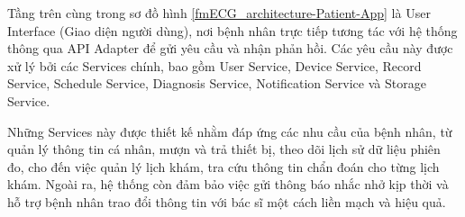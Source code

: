 Tầng trên cùng trong sơ đồ hình \ref{fmECG_architecture-Patient-App} là User Interface (Giao diện người dùng), nơi bệnh nhân trực tiếp tương tác với hệ thống thông qua API Adapter để gửi yêu cầu và nhận phản hồi.
Các yêu cầu này được xử lý bởi các Services chính, bao gồm User Service, Device Service, Record Service, Schedule Service, Diagnosis Service, Notification Service và Storage Service.

Những Services này được thiết kế nhằm đáp ứng các nhu cầu của bệnh nhân, từ quản lý thông tin cá nhân, mượn và trả thiết bị, theo dõi lịch sử dữ liệu phiên đo, cho đến việc quản lý lịch khám,
tra cứu thông tin chẩn đoán cho từng lịch khám. Ngoài ra, hệ thống còn đảm bảo việc gửi thông báo nhắc nhở kịp thời và hỗ trợ bệnh nhân trao đổi thông tin với bác sĩ một cách liền mạch và hiệu quả.

